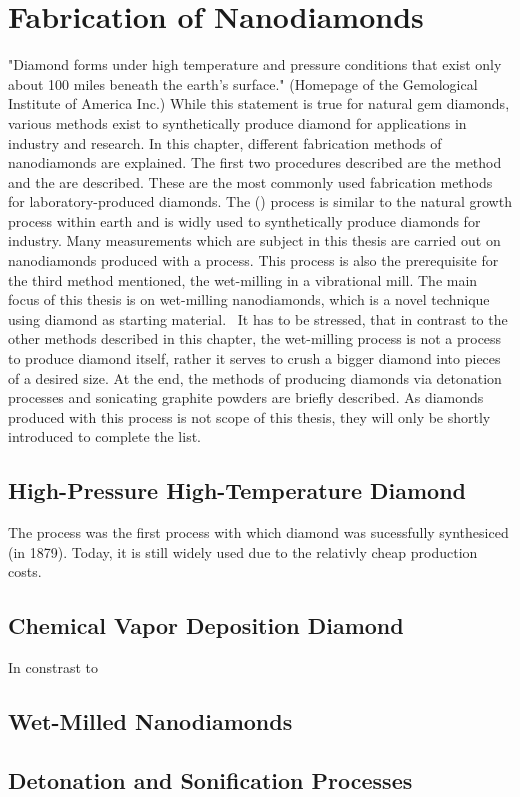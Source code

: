 
\chapter{Fabrication of Nanodiamonds}	\label{ch::fabrication_nanodiamonds}

	"Diamond forms under high temperature and pressure conditions that exist only about 100 miles beneath the earth’s surface." (Homepage of the Gemological Institute of America Inc.)
	While this statement is true for natural gem diamonds, various methods exist to synthetically produce diamond for applications in industry and research. 
	In this chapter, different fabrication methods of nanodiamonds are explained.
	The first two procedures described are the \hpht method and the \cvd are described.
	These are the most commonly used fabrication methods for laboratory-produced diamonds. 
	The \hpht (\HPHT) process is similar to the natural growth process within earth and is widly used to synthetically produce diamonds for industry.
	Many measurements which are subject in this thesis are carried out on nanodiamonds produced with a \CVD process. 
	This process is also the prerequisite for the third method mentioned, the wet-milling in a vibrational mill.
	The main focus of this thesis is on wet-milling nanodiamonds, which is a novel technique using \cvd diamond as starting material. 
	It has to be stressed, that in contrast to the other methods described in this chapter, the wet-milling process is not a process to produce diamond itself, rather it serves to crush a bigger diamond into pieces of  a desired size.
	At the end, the methods of producing diamonds via detonation processes and sonicating graphite powders are briefly described.
	As diamonds produced with this process is not scope of this thesis, they will only be shortly introduced to complete the list.

	

	\section{High-Pressure High-Temperature Diamond}

	The \HPHT process was the first process with which diamond was sucessfully synthesiced (in 1879).
	Today, it is still widely used due to the relativly cheap production costs\cite{wikiSyntheticDiamond}.

	\section{Chemical Vapor Deposition Diamond}

	In constrast to 	

	\section{Wet-Milled Nanodiamonds}
	\section{Detonation and Sonification Processes}